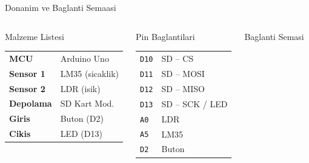 \begin{frame}{Donanim ve Baglanti Semaasi}
  \begin{columns}[T]
      \begin{block}{Malzeme Listesi}
        \begin{tabular}{ll}
          \textbf{MCU}      & Arduino Uno \\
          \textbf{Sensor 1} & LM35 (sicaklik) \\
          \textbf{Sensor 2} & LDR (isik) \\
          \textbf{Depolama} & SD Kart Mod. \\
          \textbf{Giris}    & Buton (D2) \\
          \textbf{Cikis}    & LED (D13) \\
        \end{tabular}
      \end{block}
      \vspace{4pt}
      \begin{block}{Pin Baglantilari}
        \scriptsize
        \begin{tabular}{ll}
          \texttt{D10} & SD -- CS \\
          \texttt{D11} & SD -- MOSI \\
          \texttt{D12} & SD -- MISO \\
          \texttt{D13} & SD -- SCK / LED \\
          \texttt{A0}  & LDR \\
          \texttt{A5}  & LM35 \\
          \texttt{D2}  & Buton \\
        \end{tabular}
      \end{block}

      \begin{block}{Baglanti Semasi}
        \begin{center}
\end{center}
\end{block}
\end{columns}
\end{frame}
